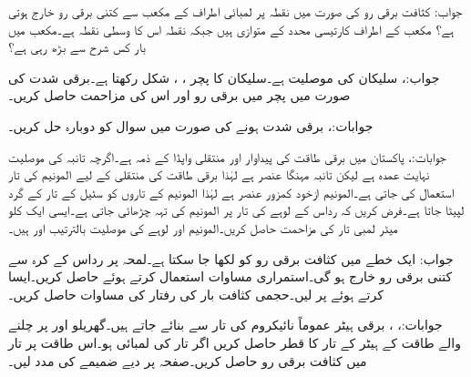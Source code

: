 جواب:
کثافت برقی رو  کی صورت میں نقطہ  پر  لمبائی اطراف کے مکعب سے کتنی برقی رو خارج ہوتی ہے؟ مکعب کے اطراف کارتیسی محدد کے متوازی ہیں جبکہ نقطہ  اس کا وسطی نقطہ ہے۔مکعب میں بار کس شرح سے بڑھ رہی ہے؟

جواب:، 
سلیکان کی موصلیت  ہے۔سلیکان کا پچر ، ،  شکل رکھتا ہے۔برقی شدت   کی صورت میں پچر میں برقی رو اور اس کی مزاحمت حاصل کریں۔

جوابات:، 
برقی شدت  ہونے کی صورت میں سوال  کو دوبارہ حل کریں۔

جوابات:، 
پاکستان میں برقی طاقت کی پیداوار اور منتقلی واپڈا کے ذمہ ہے۔اگرچہ تانبہ کی موصلیت نہایت عمدہ ہے لیکن تانبہ مہنگا عنصر ہے لہٰذا برقی طاقت کی منتقلی کے لیے المونیم کی تار استعمال کی جاتی ہے۔المونیم ازخود کمزور عنصر ہے لہٰذا المونیم کے تاروں کو سٹیل کے تار کے گرد لپیٹا جاتا ہے۔فرض کریں کہ   رداس کے لوہے کی تار پر  المونیم کی تہہ چڑھائی جاتی ہے۔ایسی ایک کلو میٹر لمبی تار کی مزاحمت حاصل کریں۔المونیم اور لوہے کی موصلیت بالترتیب  اور  ہیں۔
   
جواب:
ایک خطے میں کثافت برقی رو کو  لکھا جا سکتا ہے۔لمحہ  پر رداس  کے کرہ سے کتنی برقی رو خارج ہو گی۔استمراری مساوات  استعمال کرتے ہوئے   حاصل کریں۔ایسا کرتے ہوئے  پر  لیں۔حجمی کثافت بار  کی رفتار کی مساوات حاصل کریں۔

جوابات:، ، 
برقی ہیٹر عموماً نائیکروم کی تار سے بنائے جاتے ہیں۔گھریلو  اور  پر چلنے والے  طاقت کے ہیٹر کے تار کا قطر حاصل کریں اگر تار کی لمبائی  ہو۔اس طاقت پر تار میں کثافت برقی رو حاصل کریں۔صفحہ  پر دیے ضمیمے کی مدد لیں۔   

